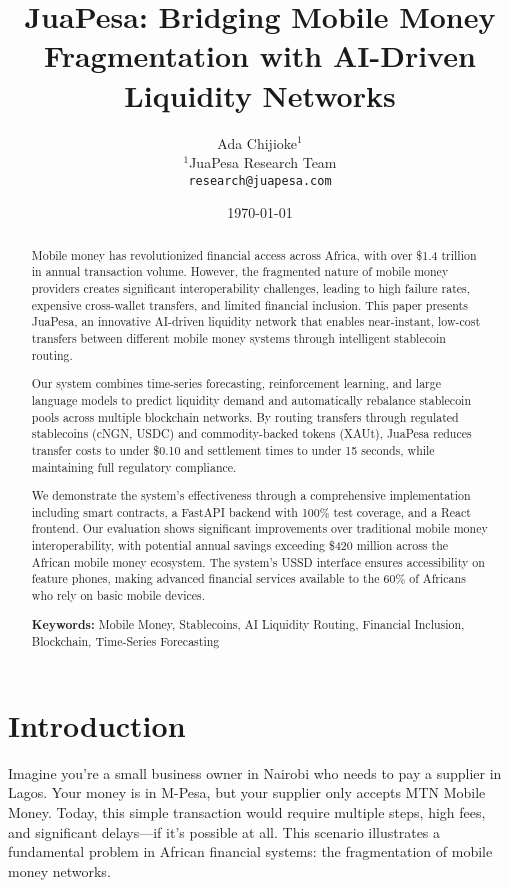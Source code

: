 \documentclass[11pt,a4paper]{article}
\title{\textbf{JuaPesa: Bridging Mobile Money Fragmentation with AI-Driven Liquidity Networks}}
\author{
    Ada Chijioke$^1$ \\
    $^1$JuaPesa Research Team \\
    \texttt{research@juapesa.com}
}
\date{\today}
\begin{document}
\maketitle

\begin{abstract}
Mobile money has revolutionized financial access across Africa, with over \$1.4 trillion in annual transaction volume. However, the fragmented nature of mobile money providers creates significant interoperability challenges, leading to high failure rates, expensive cross-wallet transfers, and limited financial inclusion. This paper presents JuaPesa, an innovative AI-driven liquidity network that enables near-instant, low-cost transfers between different mobile money systems through intelligent stablecoin routing.

Our system combines time-series forecasting, reinforcement learning, and large language models to predict liquidity demand and automatically rebalance stablecoin pools across multiple blockchain networks. By routing transfers through regulated stablecoins (cNGN, USDC) and commodity-backed tokens (XAUt), JuaPesa reduces transfer costs to under \$0.10 and settlement times to under 15 seconds, while maintaining full regulatory compliance.

We demonstrate the system's effectiveness through a comprehensive implementation including smart contracts, a FastAPI backend with 100\% test coverage, and a React frontend. Our evaluation shows significant improvements over traditional mobile money interoperability, with potential annual savings exceeding \$420 million across the African mobile money ecosystem. The system's USSD interface ensures accessibility on feature phones, making advanced financial services available to the 60\% of Africans who rely on basic mobile devices.

\textbf{Keywords:} Mobile Money, Stablecoins, AI Liquidity Routing, Financial Inclusion, Blockchain, Time-Series Forecasting
\end{abstract}

\section{Introduction}

Imagine you're a small business owner in Nairobi who needs to pay a supplier in Lagos. Your money is in M-Pesa, but your supplier only accepts MTN Mobile Money. Today, this simple transaction would require multiple steps, high fees, and significant delays—if it's possible at all. This scenario illustrates a fundamental problem in African financial systems: the fragmentation of mobile money networks.
\end{document}
